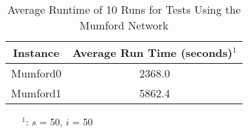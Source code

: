 \begin{table}[H]
    \centering
    \hspace*{-1.0cm}
    \begin{tabular}{|c|c|}
        \hline
        \textbf{Instance} & \textbf{Average Run Time (seconds)$^1$} \\
        \hline
        Mumford0 & 2368.0\\
        \hline
        Mumford1 & 5862.4\\
        \hline
    \end{tabular}
    \caption{Average Runtime of 10 Runs for Tests Using the Mumford Network}
    \label{tabel:runTimeMumford}
    \begin{itemize}[noitemsep]
    \item[$^1$:] $s$ = 50, $i$ = 50
    \end{itemize} 
\end{table}







